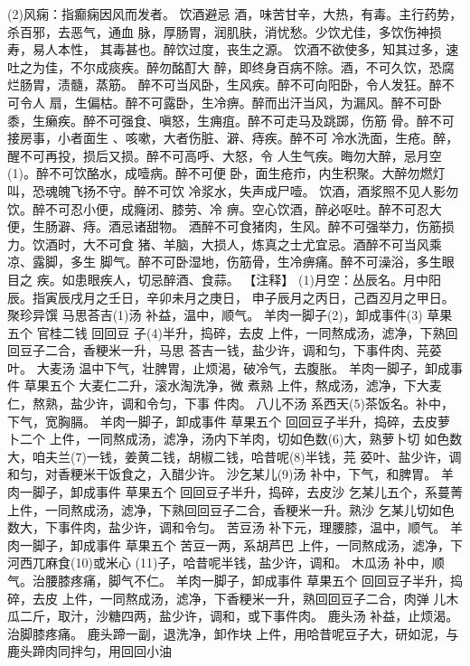 \documentclass[12pt,UTF8]{ctexbook}
\begin{document}
(2)风痫：指癫痫因风而发者。
饮酒避忌
酒，味苦甘辛，大热，有毒。主行药势，杀百邪，去恶气，通血
脉，厚肠胃，润肌肤，消忧愁。少饮尤佳，多饮伤神损寿，易人本性，
其毒甚也。醉饮过度，丧生之源。
饮酒不欲使多，知其过多，速吐之为佳，不尔成痰疾。醉勿酩酊大
醉，即终身百病不除。酒，不可久饮，恐腐烂肠胃，渍髓，蒸筋。
醉不可当风卧，生风疾。醉不可向阳卧，令人发狂。醉不可令人
扇，生偏枯。醉不可露卧，生冷痹。醉而出汗当风，为漏风。醉不可卧
黍，生癞疾。醉不可强食、嗔怒，生痈疽。醉不可走马及跳踯，伤筋
骨。醉不可接房事，小者面生 、咳嗽，大者伤脏、澼、痔疾。醉不可
冷水洗面，生疮。醉，醒不可再投，损后又损。醉不可高呼、大怒，令
人生气疾。晦勿大醉，忌月空(1)。醉不可饮酪水，成噎病。醉不可便
卧，面生疮疖，内生积聚。大醉勿燃灯叫，恐魂魄飞扬不守。醉不可饮
冷浆水，失声成尸噎。
饮酒，酒浆照不见人影勿饮。醉不可忍小便，成癃闭、膝劳、冷
痹。空心饮酒，醉必呕吐。醉不可忍大便，生肠澼、痔。酒忌诸甜物。
酒醉不可食猪肉，生风。醉不可强举力，伤筋损力。饮酒时，大不可食
猪、羊脑，大损人，炼真之士尤宜忌。酒醉不可当风乘凉、露脚，多生
脚气。醉不可卧湿地，伤筋骨，生冷痹痛。醉不可澡浴，多生眼目之
疾。如患眼疾人，切忌醉酒、食蒜。
【注释】
(1)月空：丛辰名。月中阳辰。指寅辰戌月之壬日，辛卯未月之庚日，
申子辰月之丙日，己酉丒月之甲日。
聚珍异馔
马思荅吉(1)汤 补益，温中，顺气。
羊肉一脚子(2)，卸成事件(3) 草果五个 官桂二钱 回回豆
子(4)半升，捣碎，去皮
上件，一同熬成汤，滤净，下熟回回豆子二合，香粳米一升，马思
荅吉一钱，盐少许，调和匀，下事件肉、芫荽叶。
大麦汤 温中下气，壮脾胃，止烦渴，破冷气，去腹胀。
羊肉一脚子，卸成事件 草果五个 大麦仁二升，滚水淘洗净，微
煮熟
上件，熬成汤，滤净，下大麦仁，熬熟，盐少许，调和令匀，下事
件肉。
八儿不汤 系西天(5)茶饭名。补中，下气，宽胸膈。
羊肉一脚子，卸成事件 草果五个 回回豆子半升，捣碎，去皮萝
卜二个
上件，一同熬成汤，滤净，汤内下羊肉，切如色数(6)大，熟萝卜切
如色数大，咱夫兰(7)一钱，姜黄二钱，胡椒二钱，哈昔呢(8)半钱，芫
荽叶、盐少许，调和匀，对香粳米干饭食之，入醋少许。
沙乞某儿(9)汤 补中，下气，和脾胃。
羊肉一脚子，卸成事件 草果五个 回回豆子半升，捣碎，去皮沙
乞某儿五个，系蔓菁
上件，一同熬成汤，滤净，下熟回回豆子二合，香粳米一升。熟沙
乞某儿切如色数大，下事件肉，盐少许，调和令匀。
苦豆汤 补下元，理腰膝，温中，顺气。
羊肉一脚子，卸成事件 草果五个 苦豆一两，系胡芦巴
上件，一同熬成汤，滤净，下河西兀麻食(10)或米心
(11)子，哈昔呢半钱，盐少许，调和。
木瓜汤 补中，顺气。治腰膝疼痛，脚气不仁。
羊肉一脚子，卸成事件 草果五个 回回豆子半升，捣碎，去皮
上件，一同熬成汤，滤净，下香粳米一升，熟回回豆子二合，肉弹
儿木瓜二斤，取汁，沙糖四两，盐少许，调和，或下事件肉。
鹿头汤 补益，止烦渴。治脚膝疼痛。
鹿头蹄一副，退洗净，卸作块
上件，用哈昔呢豆子大，研如泥，与鹿头蹄肉同拌匀，用回回小油
\end{document}
